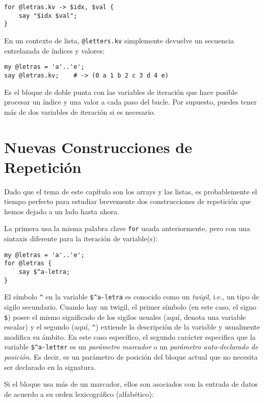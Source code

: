 \begin{lstlisting}
for @letras.kv -> $idx, $val { 
    say "$idx $val";
}
\end{lstlisting}

En un contexto de lista, \verb|@letters.kv| simplemente
devuelve un secuencia entrelazada de índices y valores:

\begin{lstlisting}
my @letras = 'a'..'e';
say @letras.kv;    # -> (0 a 1 b 2 c 3 d 4 e)
\end{lstlisting}

Es el bloque de doble punta con las variables de iteración
que hace posible procesar un índice y una valor 
a cada paso del bucle. Por supuesto, puedes tener 
más de dos variables de iteración si es necesario.


\section{Nuevas Construcciones de Repetición}

Dado que el tema de este capítulo son los arrays y las 
listas, es probablemente el tiempo perfecto para estudiar
brevemente dos construcciones de repetición que hemos
dejado a un lado hasta ahora.

La primera usa la misma palabra clave {\tt for} usada
anteriormente, pero con una sintaxis diferente para la iteración
de variable(s):

\begin{lstlisting}
my @letras = 'a'..'e';
for @letras { 
    say $^a-letra; 
}
\end{lstlisting}

El símbolo \verb|^| en la variable \verb|$^a-letra| es conocido
como un \emph{twigil}, i.e., un tipo de sigilo secundario. 
Cuando hay un twigil, el primer símbolo (en este caso, el signo
\verb|$|) posee el mismo significado de los sigilos usuales (aquí, denota
una variable escalar) y el segundo (aquí, \verb|^|) extiende la descripción
de la variable y usualmente modifica su ámbito. En este caso
específico, el segundo carácter especifica que la variable
\verb|$^a-letter| es un \emph{parámetro marcador} o un 
\emph{parámetro auto-declarado de posición}. Es decir, es un parámetro
de posición del bloque actual que no necesita ser declarado en la 
signatura.

Si el bloque usa más de un marcador, ellos son asociados con la
entrada de datos de acuerdo a su orden lexicográfico (alfabético):

